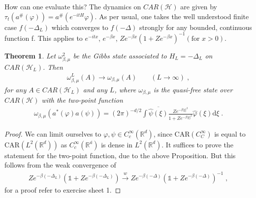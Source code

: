 \documentclass[
a4paper, %
11pt, %
onecolumn, %
openany, %
]{memoir}
\theoremstyle{definition}
\theoremstyle{remark}
\theoremstyle{plain}
\newtheorem{theorem}{Theorem}[chapter]
\begin{document}
How can one evaluate this? The dynamics on $CAR(\mathcal{H})$ are given by $\tau_t(a^{\#}(\varphi))=a^{\#}(e^{-itH}\varphi)$. As per usual, one takes the well understood finite case $f(-\Delta_L)$ which converges to $f(-\Delta)$ strongly for any bounded, continuous function f. This applies to $e^{-itx}$, $e^{-\beta x}$, $Ze^{-\beta x}(1+Ze^{-\beta x})^{-1} (\text{for }x>0)$.
\begin{theorem}
	Let $\omega_{\beta,\mu}^2$ be the Gibbs state associated to $H_L=-\Delta_L$ on $CAR(\mathcal{H}_L)$. Then \begin{align*}
	\omega_{\beta,\mu}^L(A)\overset{}{\longrightarrow}\omega_{\beta,\mu}(A) \qquad (L\rightarrow \infty)\; ,
	\end{align*}
	for any $A\in CAR(\mathcal{H}_{L})$ and any $L$, where $\omega_{\beta,\mu}$ is the quasi-free state over $CAR(\mathcal{H})$ with the two-point function \begin{align}
		\omega_{\beta,\mu}(a^*(\varphi)a(\psi))=(2\pi)^{-d/2}\int\overline{\hat{\psi}(\xi)}\frac{Ze^{-\beta |\xi|^2}}{1+Ze^{-\beta|\xi|^2}}\hat{\varphi}(\xi)\mathrm{d}\xi\; .
	\end{align}
\end{theorem}
\begin{proof}
We can limit ourselves to $\varphi,\psi\in C_c^{\infty}(\mathbb{R}^d)$, since $\mathrm{CAR}(C_C^{\infty})$ is equal to $\mathrm{CAR}(L^2(\mathbb{R}^d))$ as $C_c^{\infty}(\mathbb{R^d})$ is dense in $L^2(\mathbb{R}^d)$.
	It suffices to prove the statement for the two-point function, due to the above Proposition. But this follows from the weak convergence of \begin{align}
	Ze^{-\beta(-\Delta_L)}(\mathds{1}+Ze^{-\beta(-\Delta_L)})\overset{w}{\longrightarrow}Ze^{-\beta(-\Delta)}\left(\mathds{1}+Ze^{-\beta(-\Delta)}\right)^{-1}\; ,
	\end{align}
	for a proof refer to exercise sheet 1.
\end{proof}
\end{document}
